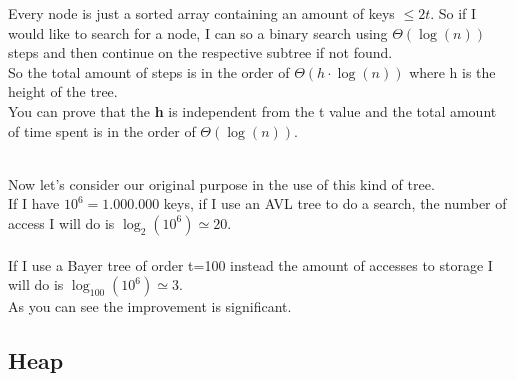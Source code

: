 \documentclass{article}
\begin{document}
Every node is just a sorted array containing an amount of keys $\leq 2t$. So if I would like to search for a node, I can so a binary search using $\Theta(\log(n))$ steps and then continue on the respective subtree if not found.\\
So the total amount of steps is in the order of $\Theta(h\cdot \log(n))$ where h is the height of the tree.\\
You can prove that the \textbf{h} is independent from the t value and the total amount of time spent is in the order of $\Theta(\log(n))$.\\ \\
\begin{large}
Now let's consider our original purpose in the use of this kind of tree.\\
If I have $10^6= 1.000.000$ keys, if I use an AVL tree to do a search, the number of access I will do is $\log_2(10^6) \simeq 20$.\\ \\
If I use a Bayer tree of order t=100 instead the amount of accesses to storage I will do is $\log_{100}(10^6) \simeq 3$.\\
As you can see the improvement is significant.
\end{large}
\subsection{Heap}
\end{document}
